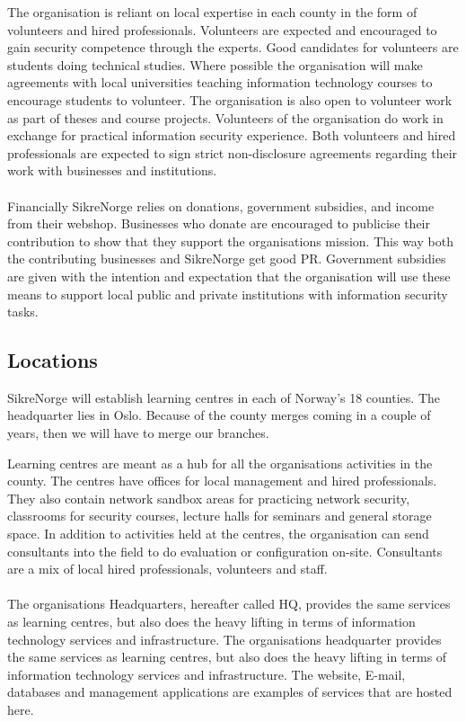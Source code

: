 The organisation is reliant on local expertise in each county in the form of volunteers and hired professionals. Volunteers are expected and encouraged to gain security competence through the experts. Good candidates for volunteers are students doing technical studies. Where possible the organisation will make agreements with local universities teaching information technology courses to encourage students to volunteer. The organisation is also open to volunteer work as part of theses and course projects. Volunteers of the organisation do work in exchange for practical information security experience. Both volunteers and hired professionals are expected to sign strict non-disclosure agreements regarding their work with businesses and institutions.
\\
\\
Financially SikreNorge relies on donations, government subsidies, and income from their webshop. Businesses who donate are encouraged to publicise their contribution to show that they support the organisations mission. This way both the contributing businesses and SikreNorge get good PR. Government subsidies are given with the intention and expectation that the organisation will use these means to support local public and private institutions with information security tasks.

\subsection{Locations}

SikreNorge will establish learning centres in each of Norway's 18 counties. The headquarter lies in Oslo. Because of the county merges coming in a couple of years, then we will have to merge our branches.

Learning centres are meant as a hub for all the organisations activities in the county. The centres have offices for local management and hired professionals. They also contain network sandbox areas for practicing network security, classrooms for security courses, lecture halls for seminars and general storage space. In addition to activities held at the centres, the organisation can send consultants into the field to do evaluation or configuration on-site. Consultants are a mix of local hired professionals, volunteers and staff.
\\
\\
The organisations Headquarters, hereafter called HQ, provides the same services as learning centres, but also does the heavy lifting in terms of information technology services and infrastructure. The organisations headquarter provides the same services as learning centres, but also does the heavy lifting in terms of information technology services and infrastructure. The website, E-mail, databases and management applications are examples of services that are hosted here.

